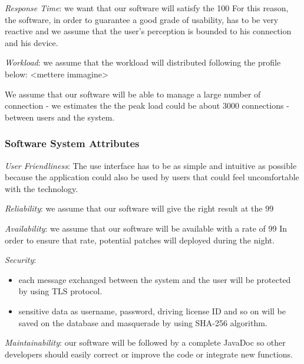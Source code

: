 \documentclass[english]{article}
\begin{document}
\begin{itemize}

  \item{\textit{Response Time}: we want that our software will satisfy the 100%
  For this reason, the software, in order to guarantee a good grade of usability, has to be very reactive
  and we assume that the user's perception is bounded to his connection and his device.}

  \item{\textit{Workload}: we assume that the workload will distributed following the profile below: <mettere immagine>\newline

  We assume that our software will be able to manage a large number of connection
  - we estimates the the peak load could be about 3000 connections - between users and the system.}

\subsubsection{Software System Attributes}

\begin{itemize}

  \item{\textit{User Friendliness}:
    The use interface has to be as simple and intuitive as possible because
    the application could also be used by users that could feel uncomfortable with the technology.}

  \item{\textit{Reliability}: we assume that our software will give the right result at the 99%

  \item{\textit{Availability}: we assume that our software will be available with a rate of 99%
                               In order to ensure that rate, potential patches will deployed during the night.}

  \item{\textit{Security}:
    \begin{itemize}
      \item{each message exchanged between the system and the user will be protected by using TLS protocol.}
      \item{sensitive data as username, password, driving license ID and so on will be saved on the database and masquerade by using SHA-256 algorithm.}
\end{itemize}
  \item{\textit{Maintainability}: our software will be followed by a complete JavaDoc so other developers should easily correct or improve the code
                                  or integrate new functions.}

}}
\end{itemize}
\end{itemize}
\end{document}
